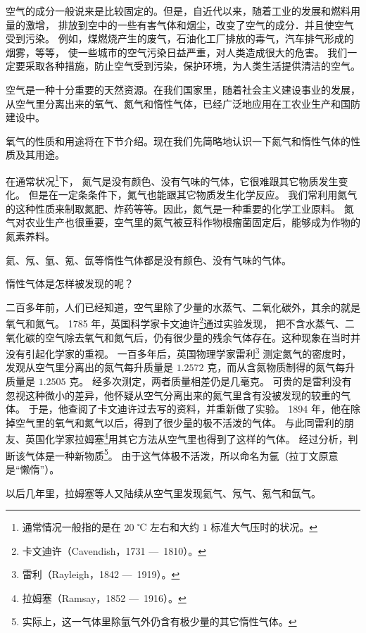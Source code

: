 空气的成分一般说来是比较固定的。但是，自近代以来，随着工业的发展和燃料用量的激增，
排放到空中的一些有害气体和烟尘，改变了空气的成分．并且使空气受到污染。
例如，煤燃烧产生的废气，石油化工厂排放的毒气，汽车排气形成的烟雾，等等，
使一些城市的空气污染日益严重，对人类造成很大的危害。
我们一定要采取各种措施，防止空气受到污染，保护环境，为人类生活提供清洁的空气。

空气是一种十分重要的天然资源。在我们国家里，随着社会主义建设事业的发展，
从空气里分离出来的氧气、氮气和惰性气体，已经广泛地应用在工农业生产和国防建设中。

氧气的性质和用途将在下节介绍。现在我们先简略地认识一下氮气和惰性气体的性质及其用途。

在通常状况\footnote{通常情况一般指的是在 $20$ ℃ 左右和大约 $1$ 标准大气压时的状况。}下，
氮气是没有颜色、没有气味的气体，它很难跟其它物质发生变化。
但是在一定条条件下，氮气也能跟其它物质发生化学反应。
我们常利用氮气的这种性质来制取氮肥、炸药等等。因此，氮气是一种重要的化学工业原料。
氮气对农业生产也很重要，空气里的氮气被豆科作物根瘤菌固定后，能够成为作物的氮素养料。

氦、氖、氩、氪、氙等惰性气体都是没有颜色、没有气味的气体。

\begin{yuedu}

    惰性气体是怎样被发现的呢？

    二百多年前，人们已经知道，空气里除了少量的水蒸气、二氧化碳外，其余的就是氧气和氮气。
    1785 年，英国科学家卡文迪许\footnote{卡文迪许（Cavendish，1731 —\, 1810）。}通过实验发现，
    把不含水蒸气、二氧化碳的空气除去氧气和氮气后，仍有很少量的残余气体存在。这种现象在当时并没有引起化学家的重视。
    一百多年后，英国物理学家雷利\footnote{雷利（Rayleigh，1842 —\, 1919）。} 测定氮气的密度时，
    发观从空气里分离出的氮气每升质量是 $1.2572$ 克，而从含氮物质制得的氮气每升质量是 $1.2505$ 克。
    经多次测定，两者质量相差仍是几毫克。
    可贵的是雷利没有忽视这种微小的差异，他怀疑从空气分离出来的氮气里含有没被发现的较重的气体。
    于是，他查阅了卡文迪许过去写的资料，并重新做了实验。
    1894 年，他在除掉空气里的氧气和氮气以后，得到了很少量的极不活泼的气体。
    与此同雷利的朋友、英国化学家拉姆塞\footnote{拉姆塞（Ramsay，1852 —\, 1916）。}用其它方法从空气里也得到了这样的气体。
    经过分析，判断该气体是一种新物质\footnote{实际上，这一气体里除氩气外仍含有极少量的其它惰性气体。}。
    由于这气体极不活泼，所以命名为氩（拉丁文原意是“懒惰”）。

    以后几年里，拉姆塞等人又陆续从空气里发现氦气、氖气、氪气和氙气。

\end{yuedu}


